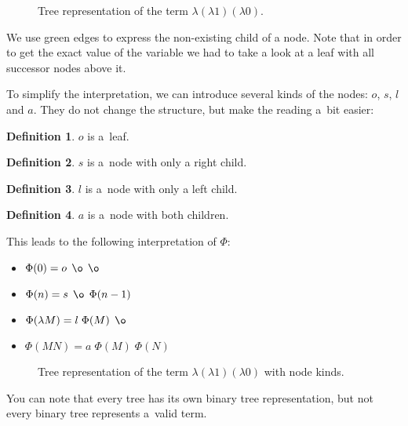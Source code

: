 \documentclass[final]{article}
\theoremstyle{definition}
\newtheorem{definition}{Definition}[subsection]
\theoremstyle{definition}
\theoremstyle{remark}
\DeclareMathOperator{\no}{\o}
\begin{document}
\begin{figure}[H]
    \centering
    
    \caption{Tree representation of the term \(\lambda (\lambda 1) (\lambda 0)\).}%
    \label{fig:lambda_tree_example_2}
\end{figure}

We use green edges to express the non-existing child of a node. Note that in order to get the exact value of the variable we had to take a look at a leaf with all successor nodes above it.

To simplify the interpretation, we can introduce several kinds of the nodes: \(o\), \(s\), \(l\) and \(a\). They do not change the structure, but make the reading a~bit easier:

\begin{definition}
    \(o\) is a~leaf.
\end{definition}

\begin{definition}
    \(s\) is a~node with only a right child.
\end{definition}

\begin{definition}
    \(l\) is a~node with only a left child.
\end{definition}

\begin{definition}
    \(a\) is a~node with both children.
\end{definition}

This leads to the following interpretation of \(\Phi\):

\begin{itemize}
    \item \(\Phi(0) = o\; \no\; \no\)
    \item \(\Phi(n) = s\; \no\; \Phi(n - 1)\)
    \item \(\Phi(\lambda M) = l\; \Phi(M)\; \no\)
    \item \(\Phi(M N) = a\; \Phi(M)\; \Phi(N)\)
\end{itemize}

\begin{figure}[H]
    \centering
    
    \caption{Tree representation of the term \(\lambda (\lambda 1) (\lambda 0)\) with node kinds.}%
    \label{fig:lambda_tree_example_3}
\end{figure}

You can note that every tree has its own binary tree representation, but not every binary tree represents a~valid term.
\end{document}
